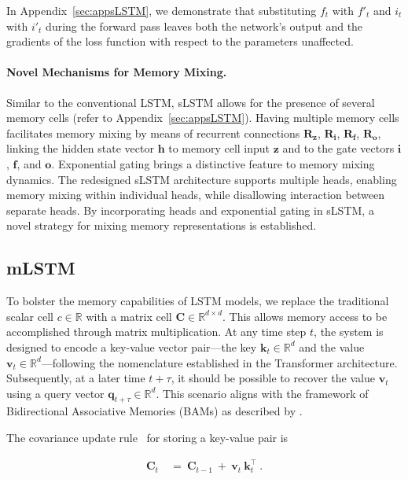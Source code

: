 In Appendix~\ref{sec:appsLSTM}, we demonstrate that substituting $f_t$ with $f'_t$ and $i_t$ with $i'_t$ during the forward pass leaves both the network’s output and the gradients of the loss function with respect to the parameters unaffected.

\paragraph{Novel Mechanisms for Memory Mixing.} Similar to the conventional LSTM, sLSTM allows for the presence of several memory cells (refer to Appendix~\ref{sec:appsLSTM}). Having multiple memory cells facilitates memory mixing by means of recurrent connections $\mathbf{R}_{\mathbf{z}}$, $\mathbf{R}_{\mathbf{i}}$, $\mathbf{R}_{\mathbf{f}}$, $\mathbf{R}_{\mathbf{o}}$, linking the hidden state vector $\mathbf{h}$ to memory cell input $\mathbf{z}$ and to the gate vectors $\mathbf{i}$, $\mathbf{f}$, and $\mathbf{o}$. Exponential gating brings a distinctive feature to memory mixing dynamics. The redesigned sLSTM architecture supports multiple heads, enabling memory mixing within individual heads, while disallowing interaction between separate heads. By incorporating heads and exponential gating in sLSTM, a novel strategy for mixing memory representations is established.

\subsection{mLSTM}
\label{sec:mLSTM}

To bolster the memory capabilities of LSTM models, we replace the traditional scalar cell $c \in \mathbb{R}$ with a matrix cell $\mathbf{C} \in \mathbb{R}^{d \times d}$. This allows memory access to be accomplished through matrix multiplication. At any time step $t$, the system is designed to encode a key-value vector pair—the key $\mathbf{k}_t \in \mathbb{R}^d$ and the value $\mathbf{v}_t \in \mathbb{R}^d$—following the nomenclature established in the Transformer architecture. Subsequently, at a later time $t+\tau$, it should be possible to recover the value $\mathbf{v}_t$ using a query vector $\mathbf{q}_{t+\tau} \in \mathbb{R}^d$. This scenario aligns with the framework of Bidirectional Associative Memories (BAMs) as described by \citep{Kohonen:72,Anderson:72,Nakano:72,Anderson:77}.

The covariance update rule~\citep{Sejnowski:77,Dayan:91} for storing a key-value pair is

\begin{align}
\mathbf{C}_t \ &= \ \mathbf{C}_{t-1} \ + \ \mathbf{v}_{t} \ \mathbf{k}_t^\top \ .
\end{align}

